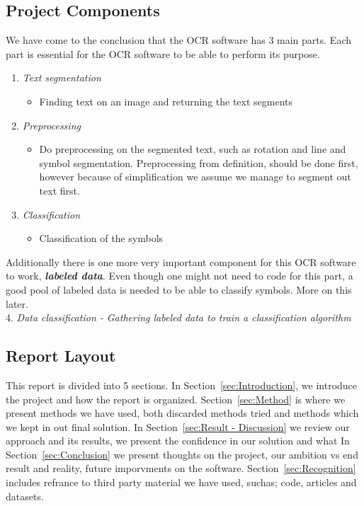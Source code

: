 \documentclass[11pt,a4paper,UKenglish]{article}
\begin{document}
\subsection{Project Components}
We have come to the conclusion that the OCR software has 3 main parts. Each
part is essential for the OCR software to be able to perform its purpose.
\begin{enumerate}
 \item{\textit{Text segmentation}}
 \begin{itemize}
  \item{Finding text on an image and returning the text segments}
 \end{itemize}
 \item{\textit{Preprocessing}}
 \begin{itemize}
  \item{Do preprocessing on the segmented text, such as rotation and line and
  symbol segmentation. Preprocessing from definition, should be done first,
  however because of simplification we assume we manage to segment out text
  first.}
 \end{itemize}
 \item{\textit{Classification}}
 \begin{itemize}
  \item{Classification of the symbols}
 \end{itemize}
\end{enumerate}

\begin{flushleft}
  Additionally there is one more very important component for this
  OCR software to work, \textit{\textbf{labeled data}}. Even though one might not
  need to code for this part, a good pool of labeled data is needed to be able to
  classify symbols. More on this later. \\
  4. \textit{Data classification - Gathering labeled data to train a classification algorithm}
\end{flushleft}


\subsection{Report Layout}
\label{subsec:Report Layout}
This report is divided into 5 sections. In
Section~\ref{sec:Introduction}, we introduce the project and how the report
is organized. Section~\ref{sec:Method} is where we present methods we have
used, both discarded methods tried and methods which we kept in out final
solution. In Section~\ref{sec:Result - Discussion} we review our approach and
its results, we present the confidence in our solution and what 
In Section~\ref{sec:Conclusion} we present thoughts on the project, our
ambition vs end result and reality, future imporvments on the software.
Section~\ref{sec:Recognition} includes refrance to third party material we
have used, suchas; code, articles and datasets.
\end{document}
